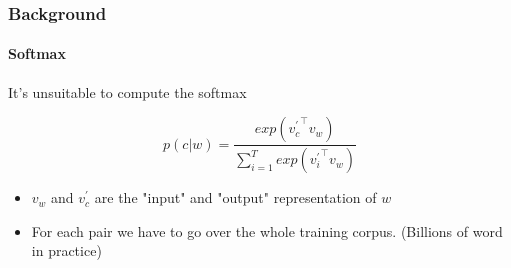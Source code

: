 \begin{frame}\frametitle{Background}\framesubtitle{Softmax}
\begin{Large}
It's unsuitable to compute the softmax
\end{Large}
   \begin{equation}
  p(c|w) =  \frac{exp( {v^{'}_c}^\intercal v_w )}{\sum_{i=1}^T exp({v^{'}_i}^\intercal v_{w})}
   \end{equation}
   \begin{itemize}
   \item $v_w$ and $v^{'}_c$ are the "input" and "output" representation of $w$
\item For each pair we have to go over the whole training corpus. (Billions of word in practice) 
   \end{itemize}
\end{frame}


